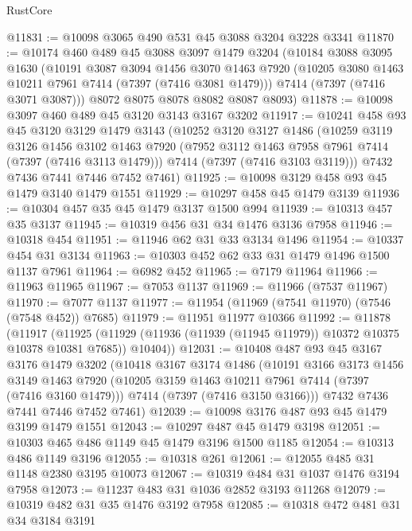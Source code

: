 \begin{lexlean}{RustCore}
\begin{coremodule}
@11831 := @10098 @3065 @490 @531 @45 @3088 @3204 @3228 @3341
@11870 := @10174
    @460
    @489
    @45
    @3088
    @3097
    @1479
    @3204
    (@10184
      @3088
      @3095
      @1630
      (@10191
        @3087
        @3094
        @1456
        @3070
        @1463
        @7920
        (@10205 @3080 @1463 @10211 @7961 @7414 (@7397 (@7416 @3081 @1479)))
        @7414
        (@7397 (@7416 @3071 @3087)))
      @8072
      @8075
      @8078
      @8082
      @8087
      @8093)
@11878 := @10098 @3097 @460 @489 @45 @3120 @3143 @3167 @3202
@11917 := @10241
    @458
    @93
    @45
    @3120
    @3129
    @1479
    @3143
    (@10252
      @3120
      @3127
      @1486
      (@10259
        @3119
        @3126
        @1456
        @3102
        @1463
        @7920
        (@7952 @3112 @1463 @7958 @7961 @7414 (@7397 (@7416 @3113 @1479)))
        @7414
        (@7397 (@7416 @3103 @3119)))
      @7432
      @7436
      @7441
      @7446
      @7452
      @7461)
@11925 := @10098 @3129 @458 @93 @45 @1479 @3140 @1479 @1551
@11929 := @10297 @458 @45 @1479 @3139
@11936 := @10304 @457 @35 @45 @1479 @3137 @1500 @994
@11939 := @10313 @457 @35 @3137
@11945 := @10319 @456 @31 @34 @1476 @3136 @7958
@11946 := @10318 @454
@11951 := @11946 @62 @31 @33 @3134 @1496
@11954 := @10337 @454 @31 @3134
@11963 := @10303 @452 @62 @33 @31 @1479 @1496 @1500 @1137 @7961
@11964 := @6982 @452
@11965 := @7179 @11964
@11966 := @11963 @11965
@11967 := @7053 @1137
@11969 := @11966 (@7537 @11967)
@11970 := @7077 @1137
@11977 := @11954 (@11969 (@7541 @11970) (@7546 (@7548 @452)) @7685)
@11979 := @11951 @11977 @10366
@11992 := @11878
    (@11917
      (@11925 (@11929 (@11936 (@11939 (@11945 @11979)) @10372 @10375 @10378 @10381 @7685)) @10404))
@12031 := @10408
    @487
    @93
    @45
    @3167
    @3176
    @1479
    @3202
    (@10418
      @3167
      @3174
      @1486
      (@10191
        @3166
        @3173
        @1456
        @3149
        @1463
        @7920
        (@10205 @3159 @1463 @10211 @7961 @7414 (@7397 (@7416 @3160 @1479)))
        @7414
        (@7397 (@7416 @3150 @3166)))
      @7432
      @7436
      @7441
      @7446
      @7452
      @7461)
@12039 := @10098 @3176 @487 @93 @45 @1479 @3199 @1479 @1551
@12043 := @10297 @487 @45 @1479 @3198
@12051 := @10303 @465 @486 @1149 @45 @1479 @3196 @1500 @1185
@12054 := @10313 @486 @1149 @3196
@12055 := @10318 @261
@12061 := @12055 @485 @31 @1148 @2380 @3195 @10073
@12067 := @10319 @484 @31 @1037 @1476 @3194 @7958
@12073 := @11237 @483 @31 @1036 @2852 @3193 @11268
@12079 := @10319 @482 @31 @35 @1476 @3192 @7958
@12085 := @10318 @472 @481 @31 @34 @3184 @3191

\end{coremodule}
\end{lexlean}
